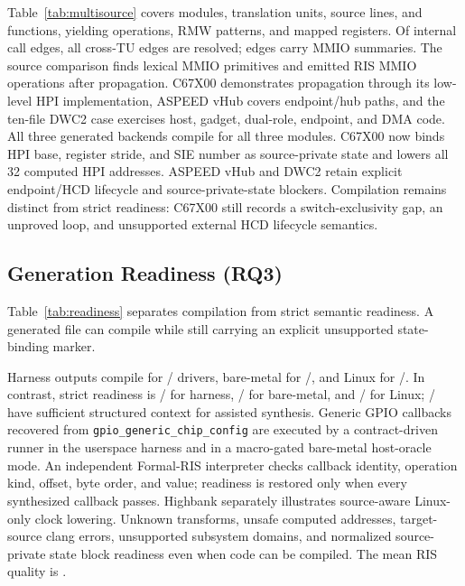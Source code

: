\documentclass[sigplan, screen, review, anonymous]{acmart}
\begin{document}
Table~\ref{tab:multisource} covers \MultiSourceDrivers{} modules, \MultiSourceTUs{} translation units, \MultiSourceLines{} source lines, and \MultiSourceFunctions{} functions, yielding \MultiSourceOps{} operations, \MultiSourceRMW{} RMW patterns, and \MultiSourceRegisters{} mapped registers. Of \MultiSourceCallEdges{} internal call edges, all \MultiSourceCrossTUEdges{} cross-TU edges are resolved; \MultiSourcePropagatedEdges{} edges carry MMIO summaries. The source comparison finds \MultiSourceSourceMMIO{} lexical MMIO primitives and \MultiSourceRISMMIO{} emitted RIS MMIO operations after propagation. C67X00 demonstrates propagation through its low-level HPI implementation, ASPEED vHub covers endpoint/hub paths, and the ten-file DWC2 case exercises host, gadget, dual-role, endpoint, and DMA code. All three generated backends compile for all three modules. C67X00 now binds HPI base, register stride, and SIE number as source-private state and lowers all 32 computed HPI addresses. ASPEED vHub and DWC2 retain explicit endpoint/HCD lifecycle and source-private-state blockers. Compilation remains distinct from strict readiness: C67X00 still records a switch-exclusivity gap, an unproved loop, and unsupported external HCD lifecycle semantics.

\subsection{Generation Readiness (RQ3)}

Table~\ref{tab:readiness} separates compilation from strict semantic readiness. A generated file can compile while still carrying an explicit unsupported state-binding marker.

\begin{table}[t]
\centering
\caption{Generation readiness scores per driver.}
\label{tab:readiness}
\resizebox{\columnwidth}{!}{\ReadinessResultsTable}
\end{table}

Harness outputs compile for \HarnessCompileCount{}/\EvalDrivers{} drivers, bare-metal for \BaremetalCompileCount{}/\EvalDrivers{}, and Linux for \LinuxCompileCount{}/\EvalDrivers{}. In contrast, strict readiness is \HarnessReadyCount{}/\EvalDrivers{} for harness, \BaremetalReadyCount{}/\EvalDrivers{} for bare-metal, and \LinuxReadyCount{}/\EvalDrivers{} for Linux; \LLMReadyCount{}/\EvalDrivers{} have sufficient structured context for assisted synthesis. Generic GPIO callbacks recovered from \texttt{gpio\_generic\_chip\_config} are executed by a contract-driven runner in the userspace harness and in a macro-gated bare-metal host-oracle mode. An independent Formal-RIS interpreter checks callback identity, operation kind, offset, byte order, and value; readiness is restored only when every synthesized callback passes. Highbank separately illustrates source-aware Linux-only clock lowering. Unknown transforms, unsafe computed addresses, target-source clang errors, unsupported subsystem domains, and normalized source-private state block readiness even when code can be compiled. The mean RIS quality is \EvalMeanRIS{}.
\end{document}
